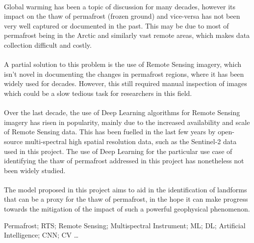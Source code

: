 \paragraph{}
Global warming has been a topic of discussion for many decades, however its impact on the thaw of permafrost (frozen ground) and vice-versa has not been very well captured or documented in the past. This may be due to most of permafrost being in the Arctic and similarly vast remote areas, which makes data collection difficult and costly.

\paragraph{}
A partial solution to this problem is the use of Remote Sensing imagery, which isn't novel in documenting the changes in permafrost regions, where it has been widely used for decades. However, this still required manual inspection of images which could be a slow tedious task for researchers in this field.

\paragraph{}
Over the last decade, the use of Deep Learning algorithms for Remote Sensing imagery has risen in popularity, mainly due to the increased availability and scale of Remote Sensing data. This has been fuelled in the last few years by open-source multi-spectral high spatial resolution data, such as the Sentinel-2 data used in this project.
The use of Deep Learning for the particular use case of identifying the thaw of permafrost addressed in this project has nonetheless not been widely studied.

\paragraph{}
The model proposed in this project aims to aid in the identification of landforms that can be a proxy for the thaw of permafrost, in the hope it can make progress towards the mitigation of the impact of such a powerful geophysical phenomenon.

\begin{keywords}
Permafrost; \gls{RTS}; Remote Sensing;  Multispectral Instrument; \gls{ML}; \gls{DL}; Artificial Intelligence; \gls{CNN}; \gls{CV} \ldots
\end{keywords} 
